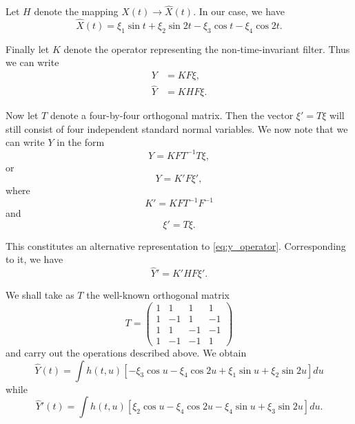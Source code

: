 \documentclass{article}
\begin{document}
Let $H$ denote the mapping $X(t) \to \hat{X}(t)$. In our case, we have
\begin{equation}
\label{eq:x_hat_counter}
\hat{X}(t) = \xi_1 \sin t + \xi_2 \sin 2t - \xi_3 \cos t - \xi_4 \cos 2t.
\end{equation}

Finally let $K$ denote the operator representing the non-time-invariant filter.
Thus we can write
\begin{align}
Y &= KF\xi, \label{eq:y_operator} \\
\hat{Y} &= KHF\xi. \label{eq:y_hat_operator}
\end{align}

Now let $T$ denote a four-by-four orthogonal matrix. Then the vector $\xi' = T\xi$
will still consist of four independent standard normal variables. We now note
that we can write $Y$ in the form
\begin{equation}
\label{eq:y_alt_form}
Y = KFT^{-1}T\xi,
\end{equation}
or
\begin{equation}
\label{eq:y_alt_form2}
Y = K'F\xi',
\end{equation}
where
\begin{equation}
\label{eq:k_prime}
K' = KFT^{-1}F^{-1}
\end{equation}
and
\begin{equation}
\label{eq:xi_prime}
\xi' = T\xi.
\end{equation}

This constitutes an alternative representation to \eqref{eq:y_operator}. Corresponding to it, we
have
\begin{equation}
\label{eq:y_hat_prime}
\hat{Y}' = K'HF\xi'.
\end{equation}

We shall take as $T$ the well-known orthogonal matrix
\begin{equation}
\label{eq:t_matrix}
T = \begin{pmatrix} 
1 & 1 & 1 & 1 \\
1 & -1 & 1 & -1 \\
1 & 1 & -1 & -1 \\
1 & -1 & -1 & 1 
\end{pmatrix}
\end{equation}
and carry out the operations described above. We obtain
\begin{equation}
\label{eq:y_hat_result}
\hat{Y}(t) = \int h(t, u) [-\xi_3 \cos u - \xi_4 \cos 2u + \xi_1 \sin u + \xi_2 \sin 2u]du
\end{equation}
while
\begin{equation}
\label{eq:y_hat_prime_result}
\hat{Y}'(t) = \int h(t, u) [\xi_2 \cos u - \xi_4 \cos 2u - \xi_4 \sin u + \xi_3 \sin 2u ]du.
\end{equation}
\end{document}
